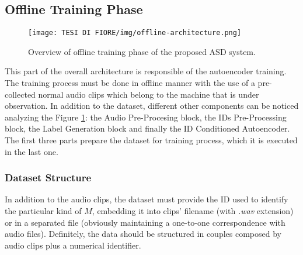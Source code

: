 \subsection{Offline Training Phase}
\begin{figure}[ht]
\texttt{[image: TESI DI FIORE/img/offline-architecture.png]}
\centering
\caption{Overview of offline training phase of the proposed ASD system.}
\label{offline-asd-system}
\end{figure}
This part of the overall architecture is responsible of the autoencoder training. The training process must be done in offline manner with the use of a pre-collected normal audio clips which belong to the machine that is under observation. In addition to the dataset, different other components can be noticed analyzing the Figure \ref{offline-asd-system}: the Audio Pre-Procesing block, the IDs Pre-Processing block, the Label Generation block and finally the ID Conditioned Autoencoder. The first three parts prepare the dataset for training process, which it is executed in the last one.
\subsubsection{Dataset Structure}
In addition to the audio clips, the dataset must provide the ID used to identify the particular kind of $M$, embedding it into clips' filename (with \textit{.wav} extension) or in a separated file (obviously maintaining a one-to-one correspondence with audio files). Definitely, the data should be structured in couples composed by audio clips plus a numerical identifier.
